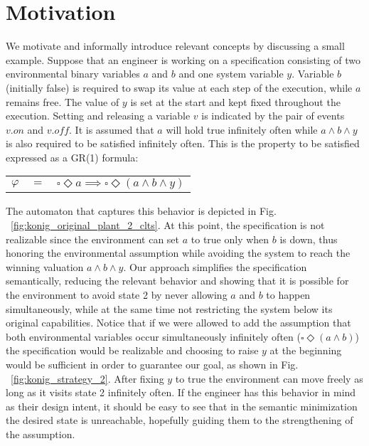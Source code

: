 \section{Motivation}\label{sec:motivation}
We motivate and informally introduce relevant concepts by discussing a small example. 
Suppose that an engineer is working on a specification consisting of two environmental 
binary variables $a$ and $b$ and one system variable $y$. Variable $b$ 
(initially false) is required to swap its value at each step of the execution, while $a$ 
remains free. The value of $y$ is set at the start and kept fixed throughout the 
execution. Setting and releasing a variable $v$ is indicated by the pair of events $v.on$ and $v.off$.
It is assumed that $a$ will hold true infinitely often while $a \wedge b \wedge y$ is also required to be satisfied infinitely often. This is the property to be satisfied expressed as a GR(1) formula: 
\begin{center}
	\begin{tabular}{ r c l }
		$\varphi$& $=$ &$\square \Diamond a\implies\square \Diamond (a \wedge b \wedge y)$\\
	\end{tabular}
\end{center}
The automaton that captures this behavior is depicted in Fig. ~\ref{fig:konig_original_plant_2_clts}. At this point, the specification is not realizable since the environment can set $a$ to true only when $b$ is down, thus honoring the environmental assumption while avoiding the system to reach the winning valuation $a \wedge b \wedge y$.  
Our approach simplifies the specification semantically, reducing the relevant behavior and showing that it is possible for the environment to avoid state 2 by never allowing $a$ and $b$ to happen simultaneously, while at the same time not restricting the system below its original capabilities.
 Notice that if we were allowed to add the assumption that both environmental variables occur simultaneously infinitely often ($\square \Diamond (a \wedge b)$) the specification would be realizable and choosing to raise $y$ at the beginning would be sufficient in order to guarantee our goal, as shown in Fig. ~\ref{fig:konig_strategy_2}. After fixing $y$ to true the environment can move freely as long as it visits state 2 infinitely often. If the engineer has this behavior in mind as their design intent, it should be easy to see that in the semantic minimization the desired state is unreachable, hopefully guiding them to the strengthening of the assumption. 

